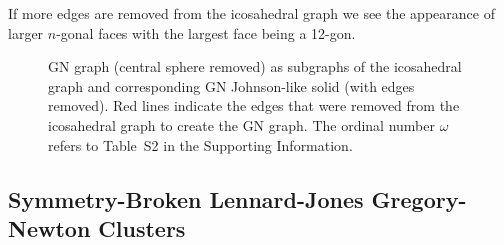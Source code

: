 If more edges are removed from the icosahedral graph we see the appearance of
larger $n$-gonal faces with the largest face being a 12-gon.
\begin{figure}[htb]
    \centering
    \caption{GN graph (central sphere removed) as subgraphs of the icosahedral graph and corresponding 
    GN Johnson-like solid (with edges removed). Red lines indicate the edges that were removed 
    from the icosahedral graph to create the GN graph.
    The ordinal number $\omega$ refers to Table~S2 in the Supporting Information.}
    \label{fig:GNJohnsongraph}
\end{figure}

\subsection{Symmetry-Broken Lennard-Jones Gregory-Newton Clusters}

